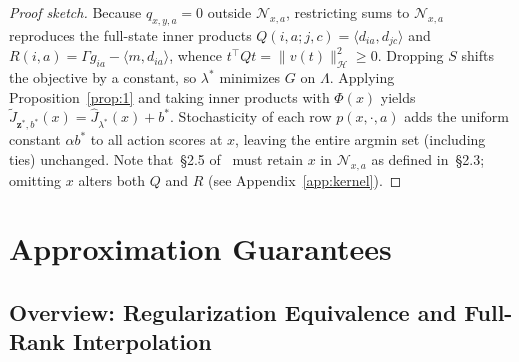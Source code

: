 \documentclass[11pt,letterpaper]{article}
\newcommand{\ip}[2]{\langle #1, #2\rangle}
\newcommand{\norm}[1]{\lVert #1\rVert}
\theoremstyle{definition}
\begin{document}
\begin{proof}[Proof sketch]
Because $q_{x,y,a}=0$ outside $\mathcal{N}_{x,a}$, restricting sums to $\mathcal{N}_{x,a}$ reproduces the full-state inner products $Q(i,a;j,c) = \ip{d_{ia}}{d_{jc}}$ and $R(i,a) = \Gamma g_{ia} - \ip{m}{d_{ia}}$, whence $t^\top Q t = \norm{v(t)}_{\mathcal{H}}^2 \ge 0$. Dropping $S$ shifts the objective by a constant, so $\lambda^*$ minimizes $G$ on $\Lambda$. Applying Proposition~\ref{prop:1} and taking inner products with $\Phi(x)$ yields $\tilde{J}_{\mathbf{z}^*,b^*}(x) = \widehat{J}_{\lambda^*}(x)+b^*$. Stochasticity of each row $p(x,\cdot,a)$ adds the uniform constant $\alpha b^*$ to all action scores at $x$, leaving the entire argmin set (including ties) unchanged. Note that~\S2.5 of~\cite{BFMZ22} must retain $x$ in $\mathcal{N}_{x,a}$ as defined in~\S2.3; omitting $x$ alters both $Q$ and $R$ (see Appendix~\ref{app:kernel}).
\end{proof}

\section{Approximation Guarantees}
\label{sec:guarantees}

\subsection{Overview: Regularization Equivalence and Full-Rank Interpolation}
\label{sec:overview}
\end{document}
